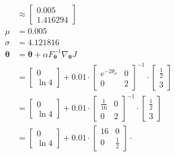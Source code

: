 \documentclass{exam}
\begin{document}
\begin{enumerate}
\begin{solutionorlines}[2in]
\begin{align*}
                &\approx \begin{bmatrix}
                0.005\\
                1.416294
                \end{bmatrix}\\
                \mu &= 0.005\\
                \sigma &= 4.121816\\
                \boldsymbol{\theta} &= \boldsymbol{\theta}  + \alpha F_{\boldsymbol{\theta}}^{-1}  \nabla_{\boldsymbol{\theta}} J \tag{Natural policy gradient}\\ 
                &= \begin{bmatrix}
                0\\
                \ln 4
                \end{bmatrix} + 0.01 \cdot 
                \begin{bmatrix}
                e^{-2\theta_\sigma}  & 0\\
                0  & 2
                \end{bmatrix}^{-1} \cdot
                \begin{bmatrix}
                \frac{1}{2}\\
                3
                \end{bmatrix} \\
                &= \begin{bmatrix}
                0\\
                \ln 4
                \end{bmatrix} + 0.01 \cdot 
                \begin{bmatrix}
                \frac{1}{16}  & 0\\
                0  & 2
                \end{bmatrix}^{-1} \cdot
                \begin{bmatrix}
                \frac{1}{2}\\
                3
                \end{bmatrix} \\
                &= \begin{bmatrix}
                0\\
                \ln 4
                \end{bmatrix} + 0.01 \cdot 
                \begin{bmatrix}
                16  & 0\\
                0  & \frac{1}{2}
                \end{bmatrix} \cdot

\end{align*}
\end{solutionorlines}
\end{enumerate}
\end{document}
